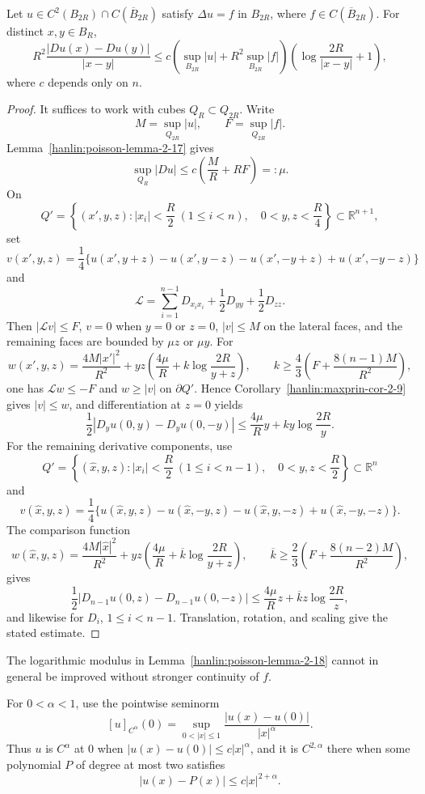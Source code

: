 \begin{lemma}\label{hanlin:poisson-lemma-2-18}
Let $u\in C^2(B_{2R})\cap C(\overline B_{2R})$ satisfy $\Delta u=f$ in
$B_{2R}$, where $f\in C(\overline B_{2R})$. For distinct $x,y\in B_R$,
\[
R^2\frac{|Du(x)-Du(y)|}{|x-y|}
\le c\left(\sup_{B_{2R}}|u|+R^2\sup_{B_{2R}}|f|\right)
\left(\log\frac{2R}{|x-y|}+1\right),
\]
where $c$ depends only on $n$.
\end{lemma}
\begin{proof}
\sketch It suffices to work with cubes $Q_R\subset Q_{2R}$. Write
\[
M=\sup_{Q_{2R}}|u|,\qquad F=\sup_{Q_{2R}}|f|.
\]
Lemma~\ref{hanlin:poisson-lemma-2-17} gives
\[
\sup_{Q_R}|Du|\le c\left(\frac MR+RF\right)=:\mu.
\]
On
\[
Q'=\left\{(x',y,z):|x_i|<\frac R2\ (1\le i<n),\quad
0<y,z<\frac R4\right\}\subset\mathbb R^{n+1},
\]
set
\[
v(x',y,z)=\frac14\{u(x',y+z)-u(x',y-z)-u(x',-y+z)+u(x',-y-z)\}
\]
and
\[
\mathcal L=\sum_{i=1}^{n-1}D_{x_ix_i}+\frac12D_{yy}+\frac12D_{zz}.
\]
Then $|\mathcal Lv|\le F$, $v=0$ when $y=0$ or $z=0$, $|v|\le M$ on
the lateral faces, and the remaining faces are bounded by $\mu z$ or $\mu y$.
For
\[
w(x',y,z)=\frac{4M|x'|^2}{R^2}
+yz\left(\frac{4\mu}{R}+k\log\frac{2R}{y+z}\right),
\qquad
k\ge\frac43\left(F+\frac{8(n-1)M}{R^2}\right),
\]
one has $\mathcal Lw\le-F$ and $w\ge|v|$ on $\partial Q'$. Hence
Corollary~\ref{hanlin:maxprin-cor-2-9} gives $|v|\le w$, and differentiation
at $z=0$ yields
\[
\frac12|D_yu(0,y)-D_yu(0,-y)|
\le\frac{4\mu}{R}y+ky\log\frac{2R}{y}.
\]
For the remaining derivative components, use
\[
Q'=\left\{(\widehat x,y,z):|x_i|<\frac R2\ (1\le i<n-1),\quad
0<y,z<\frac R2\right\}\subset\mathbb R^n
\]
and
\[
v(\widehat x,y,z)=\frac14\{u(\widehat x,y,z)-u(\widehat x,-y,z)
-u(\widehat x,y,-z)+u(\widehat x,-y,-z)\}.
\]
The comparison function
\[
w(\widehat x,y,z)=\frac{4M|\widehat x|^2}{R^2}
+yz\left(\frac{4\mu}{R}+\overline k\log\frac{2R}{y+z}\right),
\qquad
\overline k\ge\frac23\left(F+\frac{8(n-2)M}{R^2}\right),
\]
gives
\[
\frac12|D_{n-1}u(0,z)-D_{n-1}u(0,-z)|
\le\frac{4\mu}{R}z+\overline k z\log\frac{2R}{z},
\]
and likewise for $D_i$, $1\le i<n-1$. Translation, rotation, and scaling
give the stated estimate.
\end{proof}

The logarithmic modulus in Lemma~\ref{hanlin:poisson-lemma-2-18} cannot in
general be improved without stronger continuity of $f$.

For $0<\alpha<1$, use the pointwise seminorm
\[
[u]_{C^\alpha}(0)=\sup_{0<|x|\le1}\frac{|u(x)-u(0)|}{|x|^\alpha}.
\]
Thus $u$ is $C^\alpha$ at $0$ when $|u(x)-u(0)|\le c|x|^\alpha$, and it is
$C^{2,\alpha}$ there when some polynomial $P$ of degree at most two satisfies
\[
|u(x)-P(x)|\le c|x|^{2+\alpha}.
\]

